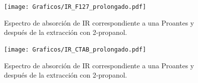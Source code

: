 	
	  \begin{figure}
			\centering
			\texttt{[image: Graficos/IR\_F127\_prolongado.pdf]}
			\caption[FTIR \pdmF\space tratamiento prolongado.]{Espectro de absorción de IR correspondiente a una Pro\pdmF\space antes y después de la extracción con 2-propanol.}
			\label{fig:IR_F127_prolongado}
			\end{figure}

		\begin{figure}
			\centering
			\texttt{[image: Graficos/IR\_CTAB\_prolongado.pdf]}
			\caption[FTIR \pdmC\space tratamiento prolongado.]{Espectro de absorción de IR correspondiente a una Pro\pdmC\space  antes y después de la extracción con 2-propanol.}
			\label{fig:IR_CTAB_prolongado}
			\end{figure}		


